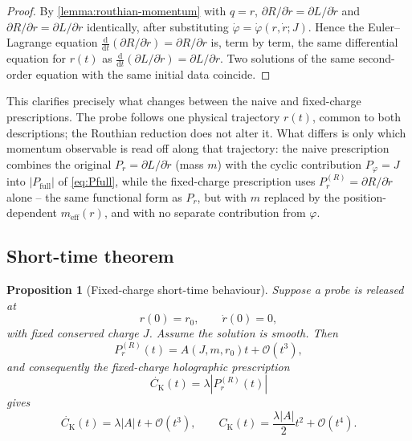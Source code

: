 \documentclass[11pt,a4paper]{article}
\theoremstyle{plain}
\newtheorem{proposition}{Proposition}[section]
\theoremstyle{definition}
\theoremstyle{remark}
\newcommand{\PrR}{P_r^{(R)}}
\newcommand{\Ck}{C_{\mathrm K}}
\newcommand{\meff}{m_{\mathrm{eff}}}
\begin{document}
\begin{proof}
By \cref{lemma:routhian-momentum} with $q=r$, $\partial R/\partial\dot r=\partial L/\partial\dot r$ and $\partial R/\partial r=\partial L/\partial r$ identically, after substituting $\dot\varphi=\dot\varphi(r,\dot r;J)$. Hence the Euler--Lagrange equation $\frac{\mathrm d}{\mathrm d t}(\partial R/\partial\dot r)=\partial R/\partial r$ is, term by term, the same differential equation for $r(t)$ as $\frac{\mathrm d}{\mathrm d t}(\partial L/\partial\dot r)=\partial L/\partial r$. Two solutions of the same second-order equation with the same initial data coincide.
\end{proof}

This clarifies precisely what changes between the naive and fixed-charge prescriptions. The probe follows one physical trajectory $r(t)$, common to both descriptions; the Routhian reduction does not alter it. What differs is only which momentum observable is read off along that trajectory: the naive prescription combines the original $P_r=\partial L/\partial\dot r$ (mass $m$) with the cyclic contribution $P_\varphi=J$ into $|P_{\mathrm{full}}|$ of \eqref{eq:Pfull}, while the fixed-charge prescription uses $\PrR=\partial R/\partial\dot r$ alone -- the same functional form as $P_r$, but with $m$ replaced by the position-dependent $\meff(r)$, and with no separate contribution from $\varphi$.

\subsection{Short-time theorem}

\begin{proposition}[Fixed-charge short-time behaviour]
\label{prop:routhian-short-time}
Suppose a probe is released at
\begin{equation*}
r(0)=r_0,
\qquad
\dot r(0)=0,
\end{equation*}
with fixed conserved charge $J$. Assume the solution is smooth. Then
\begin{equation}
\PrR(t)
=
A(J,m,r_0)t+\mathcal O(t^3),
\label{eq:Pr-short}
\end{equation}
and consequently the fixed-charge holographic prescription
\begin{equation*}
\dot{\Ck}(t)=\lambda|\PrR(t)|
\end{equation*}
gives
\begin{equation}
\dot{\Ck}(t)
=
\lambda|A|\,t+\mathcal O(t^3),
\qquad
\Ck(t)
=
\frac{\lambda|A|}{2}t^2+\mathcal O(t^4).
\label{eq:C-short-holo}
\end{equation}
\end{proposition}
\end{document}
